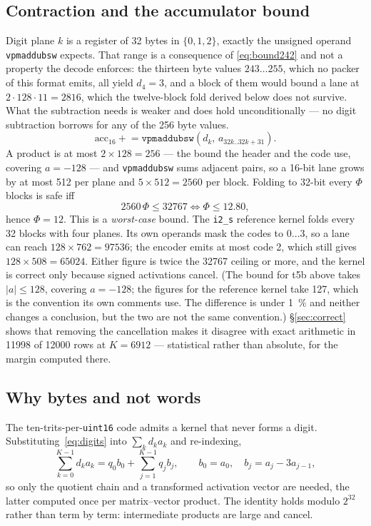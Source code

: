 \documentclass[11pt,a4paper]{article}
\newcommand{\code}[1]{\texttt{#1}}
\begin{document}
\subsection{Contraction and the accumulator bound}\label{sec:accum}
Digit plane $k$ is a register of 32 bytes in $\{0,1,2\}$, exactly the unsigned
operand \code{vpmaddubsw} expects. That range is a consequence of
\eqref{eq:bound242} and not a property the decode enforces: the thirteen byte
values $243\ldots255$, which no packer of this format emits, all yield $d_4=3$,
and a block of them would bound a lane at $2\cdot128\cdot11=\num{2816}$, which
the twelve-block fold derived below does not survive. What the subtraction needs is
weaker and does hold unconditionally --- no digit subtraction borrows for any of
the 256 byte values.
\begin{equation}
\text{acc}_{16}\mathrel{+}=\code{vpmaddubsw}\!\left(d_{k},\,a_{32k..32k+31}\right).
\end{equation}
A product is at most $2\times 128=256$ --- the bound the header and the code
use, covering $a=-128$ --- and \code{vpmaddubsw} sums adjacent
pairs, so a 16-bit lane grows by at most 512 per plane and $5\times 512=2560$
per block. Folding to 32-bit every $\Phi$ blocks is safe iff
\begin{equation}
2560\,\Phi\le\num{32767}\iff\Phi\le\num{12.80},
\label{eq:fold}
\end{equation}
hence $\Phi=12$. This is a \emph{worst-case} bound. The \code{i2\_s} reference
kernel folds every 32 blocks with four planes. Its own operands mask the codes
to $0\ldots3$, so a lane can reach $128\times 762=\num{97536}$; the encoder
emits at most code 2, which still gives $128\times 508=\num{65024}$. Either
figure is twice the \num{32767} ceiling or more, and the kernel is correct only
because signed activations cancel. (The bound for t5b above takes $|a|\le128$, covering $a=-128$; the
figures for the reference kernel take \num{127}, which is the convention its
own comments use. The difference is under \SI{1}{\percent} and neither changes
a conclusion, but the two are not the same convention.)
\S\ref{sec:correct} shows that removing the cancellation makes it
disagree with exact arithmetic in \num{11998} of \num{12000} rows at
$K=\num{6912}$ --- statistical rather than absolute, for the margin computed
there.

\subsection{Why bytes and not words}\label{sec:lane}
The ten-trits-per-\code{uint16} code admits a kernel that never forms a digit.
Substituting~\eqref{eq:digits} into $\sum_k d_ka_k$ and re-indexing,
\begin{equation}
\sum_{k=0}^{K-1}d_{k}a_{k}=q_{0}b_{0}+\sum_{j=1}^{K-1}q_{j}b_{j},
\qquad b_{0}=a_{0},\quad b_{j}=a_{j}-3a_{j-1},
\label{eq:telescope}
\end{equation}
so only the quotient chain and a transformed activation vector are needed, the
latter computed once per matrix--vector product. The identity holds modulo
$2^{32}$ rather than term by term: intermediate products are large and cancel.
\end{document}
